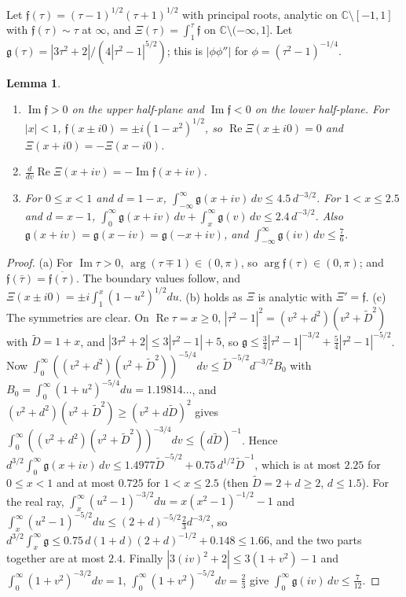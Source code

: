 \documentclass[11pt]{amsart}
\newtheorem{lemma}[theorem]{Lemma}
\theoremstyle{definition}
\theoremstyle{remark}
\numberwithin{equation}{section}
\newcommand{\C}{\mathbb{C}}
\DeclareMathOperator{\re}{Re}
\DeclareMathOperator{\im}{Im}
\begin{document}
Let $\mathfrak f(\tau)=(\tau-1)^{1/2}(\tau+1)^{1/2}$ with principal roots, analytic on $\C\setminus[-1,1]$ with $\mathfrak f(\tau)\sim\tau$ at $\infty$, and $\Xi(\tau)=\int_1^\tau\mathfrak f$ on $\C\setminus(-\infty,1]$. Let $\mathfrak g(\tau)=|3\tau^2+2|/(4|\tau^2-1|^{5/2})$; this is $|\phi\phi''|$ for $\phi=(\tau^2-1)^{-1/4}$.

\begin{lemma}\label{lem:near1-branches}
\begin{enumerate}
\item[(a)] $\im\mathfrak f>0$ on the upper half-plane and $\im\mathfrak f<0$ on the lower half-plane. For $|x|<1$, $\mathfrak f(x\pm i0)=\pm i(1-x^2)^{1/2}$, so $\re\Xi(x\pm i0)=0$ and $\Xi(x+i0)=-\Xi(x-i0)$.
\item[(b)] $\frac d{dv}\re\Xi(x+iv)=-\im\mathfrak f(x+iv)$.
\item[(c)] For $0\le x<1$ and $d=1-x$, $\int_{-\infty}^\infty\mathfrak g(x+iv)\,dv\le4.5\,d^{-3/2}$. For $1<x\le2.5$ and $d=x-1$, $\int_0^\infty\mathfrak g(x+iv)\,dv+\int_x^\infty\mathfrak g(v)\,dv\le2.4\,d^{-3/2}$. Also $\mathfrak g(x+iv)=\mathfrak g(x-iv)=\mathfrak g(-x+iv)$, and $\int_{-\infty}^\infty\mathfrak g(iv)\,dv\le\frac76$.
\end{enumerate}
\end{lemma}

\begin{proof}
(a) For $\im\tau>0$, $\arg(\tau\mp1)\in(0,\pi)$, so $\arg\mathfrak f(\tau)\in(0,\pi)$; and $\mathfrak f(\bar\tau)=\overline{\mathfrak f(\tau)}$. The boundary values follow, and $\Xi(x\pm i0)=\pm i\int_1^x(1-u^2)^{1/2}du$. (b) holds as $\Xi$ is analytic with $\Xi'=\mathfrak f$.
(c) The symmetries are clear. On $\re\tau=x\ge0$, $|\tau^2-1|^2=(v^2+d^2)(v^2+\tilde D^2)$ with $\tilde D=1+x$, and $|3\tau^2+2|\le3|\tau^2-1|+5$, so $\mathfrak g\le\frac34|\tau^2-1|^{-3/2}+\frac54|\tau^2-1|^{-5/2}$. Now $\int_0^\infty((v^2+d^2)(v^2+\tilde D^2))^{-5/4}dv\le\tilde D^{-5/2}d^{-3/2}B_0$ with $B_0=\int_0^\infty(1+u^2)^{-5/4}du=1.19814\ldots$, and $(v^2+d^2)(v^2+\tilde D^2)\ge(v^2+d\tilde D)^2$ gives $\int_0^\infty((v^2+d^2)(v^2+\tilde D^2))^{-3/4}dv\le(d\tilde D)^{-1}$. Hence $d^{3/2}\int_0^\infty\mathfrak g(x+iv)\,dv\le1.4977\tilde D^{-5/2}+0.75\,d^{1/2}\tilde D^{-1}$, which is at most $2.25$ for $0\le x<1$ and at most $0.725$ for $1<x\le2.5$ (then $\tilde D=2+d\ge2$, $d\le1.5$). For the real ray, $\int_x^\infty(u^2-1)^{-3/2}du=x(x^2-1)^{-1/2}-1$ and $\int_x^\infty(u^2-1)^{-5/2}du\le(2+d)^{-5/2}\frac23d^{-3/2}$, so $d^{3/2}\int_x^\infty\mathfrak g\le0.75\,d(1+d)(2+d)^{-1/2}+0.148\le1.66$, and the two parts together are at most $2.4$. Finally $|3(iv)^2+2|\le3(1+v^2)-1$ and $\int_0^\infty(1+v^2)^{-3/2}dv=1$, $\int_0^\infty(1+v^2)^{-5/2}dv=\frac23$ give $\int_0^\infty\mathfrak g(iv)\,dv\le\frac7{12}$.
\end{proof}
\end{document}
